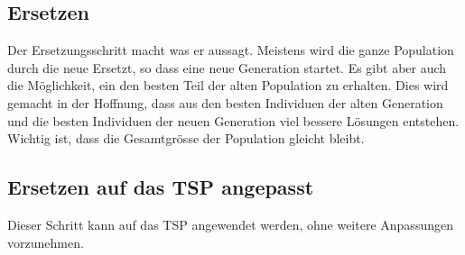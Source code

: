 %
%
%
%
\subsection{Ersetzen
\label{varalgbuch:paper:varalg:subsection:replacement}}
Der Ersetzungsschritt macht was er aussagt. Meistens wird die ganze 
Population durch die neue Ersetzt, so dass eine neue Generation startet.
Es gibt aber auch die Möglichkeit, ein den besten Teil der alten Population 
zu erhalten. Dies wird gemacht in der Hoffnung, dass aus den besten Individuen
der alten Generation und die besten Individuen der neuen Generation viel 
bessere Lösungen entstehen. Wichtig ist, dass die Gesamtgrösse der Population
gleicht bleibt.

\subsection{Ersetzen auf das TSP angepasst
\label{buch:paper:varalg:subsection:replacement_tsp}}
Dieser Schritt kann auf das TSP angewendet werden, ohne weitere
Anpassungen vorzunehmen.
